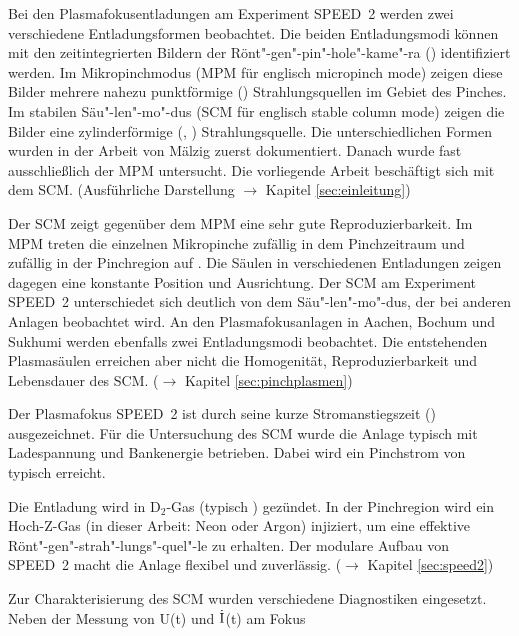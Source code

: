 %
%
\setcounter{page}{1}
\label{sec:zusammenfassung}
%
Bei den Plasmafokusentladungen am Experiment SPEED~2 werden zwei
verschiedene Entladungsformen beobachtet. Die beiden
Entladungsmodi können mit den zeitintegrierten Bildern der
Rönt"-gen"-pin"-hole"-kame"-ra ()
identifiziert werden. Im Mikropinchmodus (MPM für englisch
micropinch mode) zeigen diese Bilder mehrere nahezu punktförmige
() Strahlungsquellen im Gebiet des Pinches. Im
stabilen Säu"-len"-mo"-dus (SCM für englisch stable column mode)
zeigen die Bilder eine zylinderförmige (,
) Strahlungsquelle. Die unterschiedlichen
Formen wurden in der Arbeit von Mälzig \cite{maelzig:phd} zuerst
dokumentiert. Danach wurde fast ausschließlich der MPM untersucht.
Die vorliegende Arbeit beschäftigt sich mit dem SCM. (Ausführliche
Darstellung $\rightarrow$ Kapitel \vref{sec:einleitung})
\par
Der SCM zeigt gegenüber dem MPM eine sehr gute Reproduzierbarkeit.
Im MPM treten die einzelnen Mikropinche zufällig in dem
Pinchzeitraum und zufällig in der Pinchregion auf
\cite{roewe:phd}. Die Säulen in verschiedenen Entladungen zeigen
dagegen eine konstante Position und Ausrichtung. Der SCM am
Experiment SPEED~2 unterschiedet sich deutlich von dem
Säu"-len"-mo"-dus, der bei anderen Anlagen beobachtet wird. An den
Plasmafokusanlagen in Aachen, Bochum und Sukhumi werden ebenfalls
zwei Entladungsmodi beobachtet. Die entstehenden Plasmasäulen
erreichen aber nicht die Homogenität, Reproduzierbarkeit und
Lebensdauer des SCM. ($\rightarrow$ Kapitel
\vref{sec:pinchplasmen})
\par
Der Plasmafokus SPEED~2 ist durch seine kurze Stromanstiegszeit
() ausgezeichnet. Für die Untersuchung des SCM
wurde die Anlage typisch mit  Ladespannung und
 Bankenergie betrieben. Dabei wird ein Pinchstrom von
typisch  erreicht.
\par
Die Entladung wird in D$_2$-Gas (typisch ) gezündet.
In der Pinchregion wird ein Hoch-Z-Gas (in dieser Arbeit: Neon
oder Argon) injiziert, um eine effektive
Rönt"-gen"-strah"-lungs"-quel"-le zu erhalten. Der modulare Aufbau
von SPEED~2 macht die Anlage flexibel und zuverlässig.
($\rightarrow$ Kapitel \vref{sec:speed2})
\par
Zur Charakterisierung des SCM wurden verschiedene Diagnostiken
eingesetzt. Neben der Messung von U(t) und $\rm\dot I$(t) am Fokus
